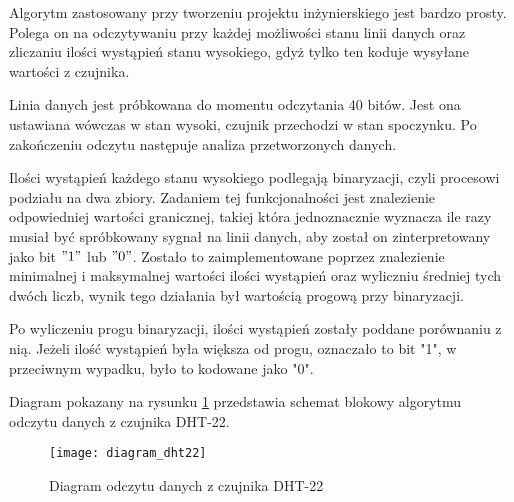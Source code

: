 Algorytm zastosowany przy tworzeniu projektu inżynierskiego jest bardzo prosty. Polega on na odczytywaniu przy każdej możliwości stanu linii danych oraz zliczaniu ilości wystąpień stanu wysokiego, gdyż tylko ten koduje wysyłane wartości z czujnika.

Linia danych jest próbkowana do momentu odczytania 40 bitów. Jest ona ustawiana wówczas w stan wysoki, czujnik przechodzi w stan spoczynku. Po zakończeniu odczytu następuje analiza przetworzonych danych.

Ilości wystąpień każdego stanu wysokiego podlegają binaryzacji, czyli procesowi podziału na dwa zbiory. Zadaniem tej funkcjonalności jest znalezienie odpowiedniej wartości granicznej, takiej która jednoznacznie wyznacza ile razy musiał być spróbkowany sygnał na linii danych, aby został on zinterpretowany jako bit $"1"$ lub $"0"$. Zostało to zaimplementowane poprzez znalezienie minimalnej i maksymalnej wartości ilości wystąpień oraz wyliczniu średniej tych dwóch liczb, wynik tego działania był wartością progową przy binaryzacji.

Po wyliczeniu progu binaryzacji, ilości wystąpień zostały poddane porównaniu z nią. Jeżeli ilość wystąpień była większa od progu, oznaczało to bit "1", w przeciwnym wypadku, było to kodowane jako "0".

Diagram pokazany na rysunku \ref{fig:diagram_dht22} przedstawia schemat blokowy algorytmu odczytu danych z czujnika DHT-22.
\begin{figure}[h]
\centering
\texttt{[image: diagram\_dht22]}
\caption{Diagram odczytu danych z czujnika DHT-22}
\label{fig:diagram_dht22}
\end{figure}